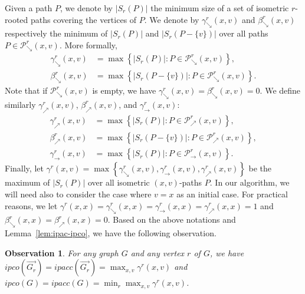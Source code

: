 \documentclass[a4paper]{article}
\newcommand{\ipac}[1]{ipacc\left(#1\right)}
\newcommand{\ipco}[1]{ipco\left(#1\right)}
\newcommand{\coverP}[2]{S_{#1}\left(#2\right)}
\newcommand{\pathseta}[3]{\mathcal{P}_{\searrow}^{#1}\left(#2,#3\right)}
\newcommand{\pathseteq}[3]{\mathcal{P}_{\rightarrow}^{#1}\left(#2,#3\right)}
\newcommand{\pathsetd}[3]{\mathcal{P}_{\nearrow}^{#1}\left(#2,#3\right)}
\newtheorem{observation}[theorem]{Observation}
\begin{document}
Given a path $P$, we denote by $|\coverP{r}{P}|$ the minimum size of a
set of isometric $r$-rooted paths covering the vertices of $P$.  We
denote by $\gamma^r_{\searrow}(x,v)$ and $\beta^r_{\searrow}(x,v)$
respectively the minimum of $|\coverP{r}{P}|$ and
$|\coverP{r}{P-\{v\}}|$ over all paths $P\in \pathseta{r}{x}{v}$. More
formally,
\begin{align*}
  \gamma^r_{\searrow}(x,v)&=\max\left\{ |\coverP{r}{P}| \colon P \in \pathseta{r}{x}{v} \right\}, \\
  \beta^r_{\searrow}(x,v)&=\max\left\{ |\coverP{r}{P - \{v\}}|\colon P\in \pathseta{r}{x}{v} \right\}.
\end{align*}
%
Note that if $\pathseta{r}{x}{v}$ is empty, we have
$\gamma^r_{\searrow}(x,v) = \beta^r_{\searrow}(x,v) = 0$.  We define
similarly $\gamma^r_{\nearrow}(x,v)$, $\beta^r_{\nearrow}(x,v)$, and
$\gamma^r_{\rightarrow}(x,v)$:
\vspace{-7.5pt}
\begin{align*}
  \gamma^r_{\nearrow}(x,v)&=\max\left\{ |\coverP{r}{P}|\colon P\in \pathsetd{r}{x}{v} \right\},\\ 
  \beta^r_{\nearrow}(x,v)&=\max\left\{ |\coverP{r}{P- \{v\}}|\colon P\in \pathsetd{r}{x}{v} \right\},\\
  \gamma^r_{\rightarrow}(x,v)&=\max\left\{ |\coverP{r}{P}|\colon P\in \pathseteq{r}{x}{v} \right\}. %
\end{align*}
%
Finally, let
$\gamma^r(x,v) = \max\left\{ \gamma^r_{\searrow}(x,v),
  \gamma^r_{\rightarrow}(x,v) , \gamma^r_{\nearrow}(x,v) \right\} $ be
the maximum of $|S_r(P)|$ over all isometric $(x,v)$-paths $P$.
%
In our algorithm, we will need also to consider the case where $v=x$
as an initial case. For practical reasons, we let
$\gamma^r(x,x) = \gamma^r_{\searrow}(x,x) =
\gamma^r_{\rightarrow}(x,x) = \gamma^r_{\nearrow}(x,x) = 1$ and
$\beta^r_{\searrow}(x,x) = \beta^r_{\nearrow}(x,x) =0$.
Based on the above notations and Lemma~\ref{lem:ipac-ipco}, we have the following observation.

\begin{observation}\label{obs:triv-poly}
  For any graph $G$ and any vertex $r$ of $G$, we have
  $\ipco{\overrightarrow{G_r}} = \ipac{\overrightarrow{G_r}} =
  \max_{x,v} \gamma^r(x,v)$ and
  $\ipco{G} = \ipac{G} = \min_{r} \max_{x,v} \gamma^r(x,v)$.
\end{observation}
\end{document}
